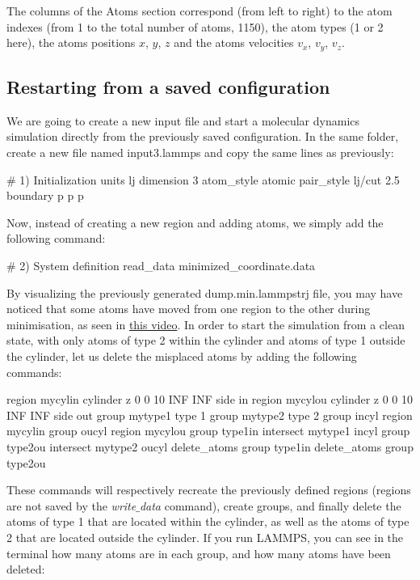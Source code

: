 \noindent The columns of the Atoms section
correspond (from left to right) to the atom indexes (from 1
to the total number of atoms, 1150), the atom types (1 or 2
here), the atoms positions $x$, $y$, $z$ and the
atoms velocities $v_x$, $v_y$, $v_z$.

\subsection{Restarting from a saved configuration}

\noindent We are going to create a new input file and start a
molecular dynamics simulation directly from the previously
saved configuration. In the same folder, create a new file
named input3.lammps and copy the same lines as previously:

\begin{lcverbatim}
# 1) Initialization
units lj
dimension 3
atom_style atomic
pair_style lj/cut 2.5
boundary p p p
\end{lcverbatim}

\noindent Now, instead of creating a new region and adding atoms, we
simply add the following command:

\begin{lcverbatim}
# 2) System definition
read_data minimized_coordinate.data
\end{lcverbatim}

\noindent By visualizing the previously generated dump.min.lammpstrj
file, you may have noticed that some atoms have moved from
one region to the other during minimisation, as seen in
\href{https://www.youtube.com/embed/gfJ_n33-F6A}{this video}.
In order to start the simulation from a clean state, with
only atoms of type 2 within the cylinder and atoms of type
1 outside the cylinder, let us delete the misplaced atoms
by adding the following commands:

\begin{lcverbatim}
region mycylin cylinder z 0 0 10 INF INF side in
region mycylou cylinder z 0 0 10 INF INF side out
group mytype1 type 1
group mytype2 type 2
group incyl region mycylin
group oucyl region mycylou
group type1in intersect mytype1 incyl
group type2ou intersect mytype2 oucyl
delete_atoms group type1in
delete_atoms group type2ou
\end{lcverbatim}

\noindent These commands will respectively recreate
the previously defined regions (regions are not saved by the
\textit{write$\_$data} command), create groups, and finally delete the
atoms of type 1 that are located within the cylinder, as
well as the atoms of type 2 that are located outside the
cylinder. If you run LAMMPS, you can see in the terminal how
many atoms are in each group, and how many atoms have been
deleted:

